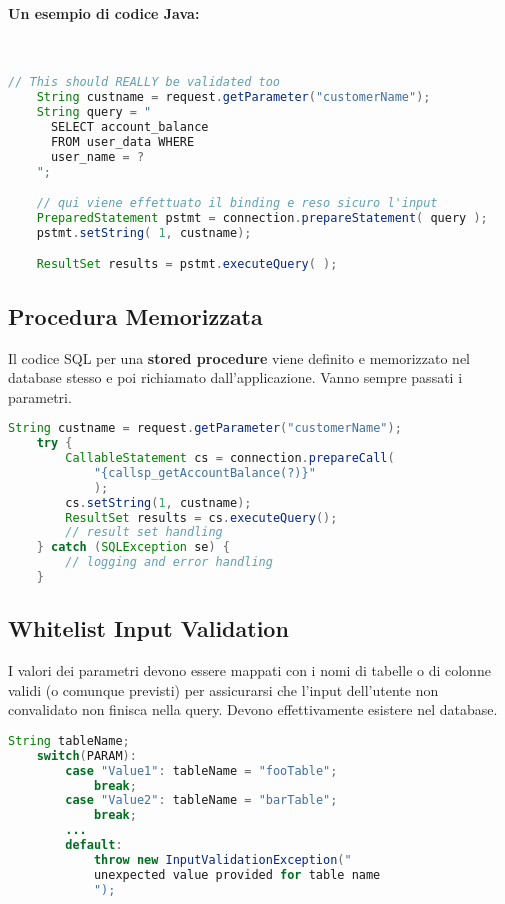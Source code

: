 \paragraph{Un esempio di codice Java:} \

\begin{lstlisting}[language=Java]
    // This should REALLY be validated too
    String custname = request.getParameter("customerName");
    String query = "
      SELECT account_balance 
      FROM user_data WHERE
      user_name = ? 
    ";

    // qui viene effettuato il binding e reso sicuro l'input
    PreparedStatement pstmt = connection.prepareStatement( query );
    pstmt.setString( 1, custname);

    ResultSet results = pstmt.executeQuery( );
\end{lstlisting}

\subsection{Procedura Memorizzata}

Il codice SQL per una \textbf{stored procedure} viene definito e memorizzato nel
database stesso e
poi richiamato dall'applicazione. Vanno sempre passati i parametri.

\begin{lstlisting}[language=Java, caption=Esempio di codice Java che
    sfrutta una \textit{stored procedure}]
    String custname = request.getParameter("customerName");
    try {
        CallableStatement cs = connection.prepareCall(
            "{callsp_getAccountBalance(?)}"
            );
        cs.setString(1, custname);
        ResultSet results = cs.executeQuery();
        // result set handling
    } catch (SQLException se) {
        // logging and error handling
    }
\end{lstlisting}

\subsection{Whitelist Input Validation}

I valori dei parametri devono essere mappati con i nomi di tabelle o di colonne
validi (o comunque previsti) per assicurarsi che l'input dell'utente non
convalidato non finisca nella
query. Devono effettivamente esistere nel database.

\begin{lstlisting}[language=Java, caption=Esempio di codic Java che effettua 
    input validation tramite whitelist.]
    String tableName;
    switch(PARAM):
        case "Value1": tableName = "fooTable";
            break;
        case "Value2": tableName = "barTable";
            break;
        ...
        default: 
            throw new InputValidationException("
            unexpected value provided for table name
            ");
\end{lstlisting}

